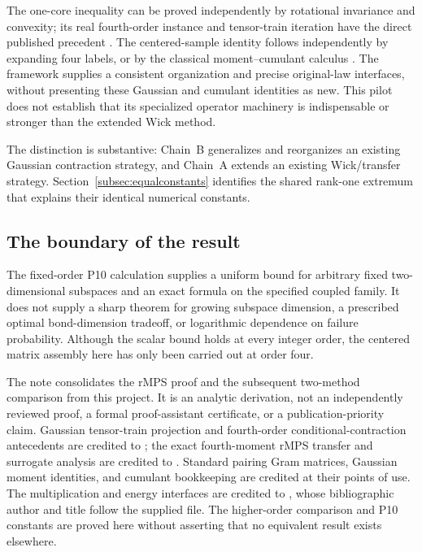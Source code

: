 \documentclass[11pt]{article}
\numberwithin{equation}{section}
\theoremstyle{definition}\newtheorem{definition}[theorem]{Definition}
\theoremstyle{remark}\newtheorem{remark}[theorem]{Remark}
\begin{document}
The one-core inequality can be proved independently by rotational invariance
and convexity; its real fourth-order instance and tensor-train iteration have
the direct published precedent \cite[Section~5.1]{RR2020}. The centered-sample
identity follows independently by expanding four labels, or by the classical
moment--cumulant calculus \cite{McCullagh}. The framework supplies a consistent
organization and precise original-law interfaces, without presenting these
Gaussian and cumulant identities as new. This pilot does not establish that its specialized
operator machinery is indispensable or stronger than the extended Wick method.

The distinction is substantive: Chain~B generalizes and reorganizes an existing
Gaussian contraction strategy, and Chain~A extends an existing Wick/transfer
strategy. Section~\ref{subsec:equalconstants} identifies the shared rank-one
extremum that explains their identical numerical constants.

\subsection{The boundary of the result}
The fixed-order P10 calculation supplies a uniform bound for arbitrary fixed
two-dimensional subspaces and an exact formula on the specified coupled family.
It does not supply a sharp theorem for growing subspace dimension, a prescribed
optimal bond-dimension tradeoff, or logarithmic dependence on failure probability.
Although the scalar bound holds at every integer order, the centered matrix
assembly here has only been carried out at order four.

The note consolidates the rMPS proof and the subsequent two-method comparison
from this project. It is an analytic derivation, not an independently reviewed
proof, a formal proof-assistant certificate, or a publication-priority claim.
Gaussian tensor-train projection and fourth-order conditional-contraction
antecedents are credited to \cite{RR2020}; the exact fourth-moment rMPS transfer
and surrogate analysis are credited to \cite{CEMT}. Standard pairing Gram
matrices, Gaussian moment identities, and cumulant bookkeeping are credited at
their points of use. The multiplication and energy interfaces are credited to
\cite{Framework}, whose bibliographic author and title follow the supplied file.
The higher-order comparison and P10 constants are proved here without asserting
that no equivalent result exists elsewhere.

\par{}
\end{document}
